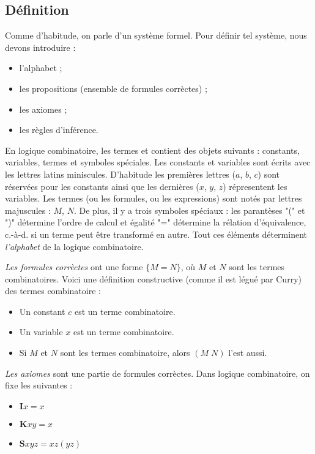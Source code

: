 \subsection*{Définition}

Comme d'habitude, on parle d'un système formel. Pour définir tel système, nous devons introduire :
\begin{itemize}
	\item l'alphabet ;
	\item les propositions (ensemble de formules corrèctes) ;
	\item les axiomes ;
	\item les règles d'inférence.
\end{itemize}

En logique combinatoire, les termes et contient des objets suivants : constants, variables, termes et symboles spéciales. Les constants et variables sont écrits avec les lettres latins miniscules. D'habitude les premières lettres ($a$, $b$, $c$) sont réservées pour les constants ainsi que les dernières ($x$, $y$, $z$) répresentent les variables. Les termes (ou les formules, ou les expressions) sont notés par lettres majuscules : $M$, $N$. De plus, il y a trois symboles spéciaux : les parantèses "(" et ")" détermine l'ordre de calcul et égalité "=" détermine la rélation d'équivalence, c.-à-d. si un terme peut être transformé en autre.
Tout ces éléments déterminent \emph{l'alphabet} de la logique combinatoire.

\emph{Les formules corrèctes} ont une forme $\{M = N\}$, où $M$ et $N$ sont les termes combinatoires. Voici une définition constructive (comme il est légué par Curry) des termes combinatoire :
\begin{itemize}
	\item Un constant $c$ est un terme combinatoire.
	\item Un variable $x$ est un terme combinatoire.
	\item Si $M$ et $N$ sont les termes combinatoire, alors $(M \; N)$ l'est aussi.
\end{itemize}

\emph{Les axiomes} sont une partie de formules corrèctes. Dans logique combinatoire, on fixe les suivantes :
\begin{itemize}
	\item $\mathbf{I} x = x$
	\item $\mathbf{K} xy = x$
	\item $\mathbf{S} xyz = xz (yz)$
\end{itemize}


